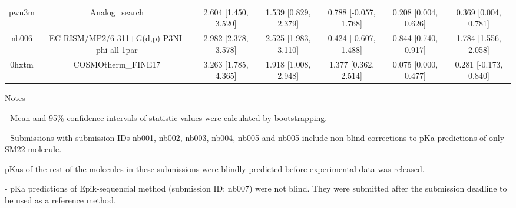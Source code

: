 \documentclass{article}
\begin{document}
\begin{center}
\begin{longtable}{|ccccccc|}
 pwn3m &                                     Analog\_search &  2.604 [1.450, 3.520] &  1.539 [0.829, 2.379] &    0.788 [-0.057, 1.768] &  0.208 [0.004, 0.626] &   0.369 [0.004, 0.781] \\
 nb006 &         EC-RISM/MP2/6-311+G(d,p)-P3NI-phi-all-1par &  2.982 [2.378, 3.578] &  2.525 [1.983, 3.110] &    0.424 [-0.607, 1.488] &  0.844 [0.740, 0.917] &   1.784 [1.556, 2.058] \\
 0hxtm &                                 COSMOtherm\_FINE17 &  3.263 [1.785, 4.365] &  1.918 [1.008, 2.948] &     1.377 [0.362, 2.514] &  0.075 [0.000, 0.477] &  0.281 [-0.173, 0.840] \\
\end{longtable}
\end{center}

Notes

- Mean and 95\% confidence intervals of statistic values were calculated by bootstrapping.

- Submissions with submission IDs nb001, nb002, nb003, nb004, nb005 and nb005 include non-blind corrections to pKa predictions of only SM22 molecule.

pKas of the rest of the molecules in these submissions were blindly predicted before experimental data was released.

- pKa predictions of Epik-sequencial method (submission ID: nb007) were not blind. They were submitted after the submission deadline to be used as a reference method.
\end{document}
